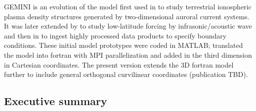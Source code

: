 \documentclass[11pt,letterpaper]{article}
\begin{document}
GEMINI is an evolution of the model first used in \citet{Zettergren:2012} to study terrestrial ionospheric plasma density structures generated by two-dimensional auroral current systems.  It was later extended by \citet{Zettergren:2013} to study low-latitude forcing by infrasonic/acoustic wave and then in \citet{Zettergren:2014} to ingest highly processed data products to specify boundary conditions.  These initial model prototypes were coded in MATLAB; \citet{Zettergren:2015b} translated the model into fortran with MPI parallelization and added in the third dimension in Cartesian coordinates.  The present version extends the 3D fortran model further to include general orthogonal curvilinear coordinates (publication TBD).  


\subsection{Executive summary}
\end{document}
